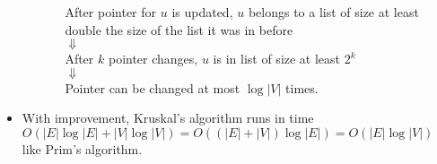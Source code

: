 \documentclass[11pt]{article}
\begin{document}
\begin{itemize}
\begin{itemize}
\begin{itemize}
      After pointer for $u$ is updated, $u$ belongs to a list of
      size at least double the size of the list it was in before \\
      $\Downarrow$ \\
      After $k$ pointer changes, $u$ is in list of size at least
      $2^k$ \\
      $\Downarrow$ \\
      Pointer can be changed at most $\log \vert V \vert$ times.
    \end{itemize}
  \end{itemize}
\item With improvement, Kruskal's algorithm runs in time $O(|E|\log |E| +
  |V|\log |V|)=O((|E|+|V|)\log |E|) = O(|E|\log |V|)$ like Prim's
  algorithm.
\end{itemize}


 
\end{document}
